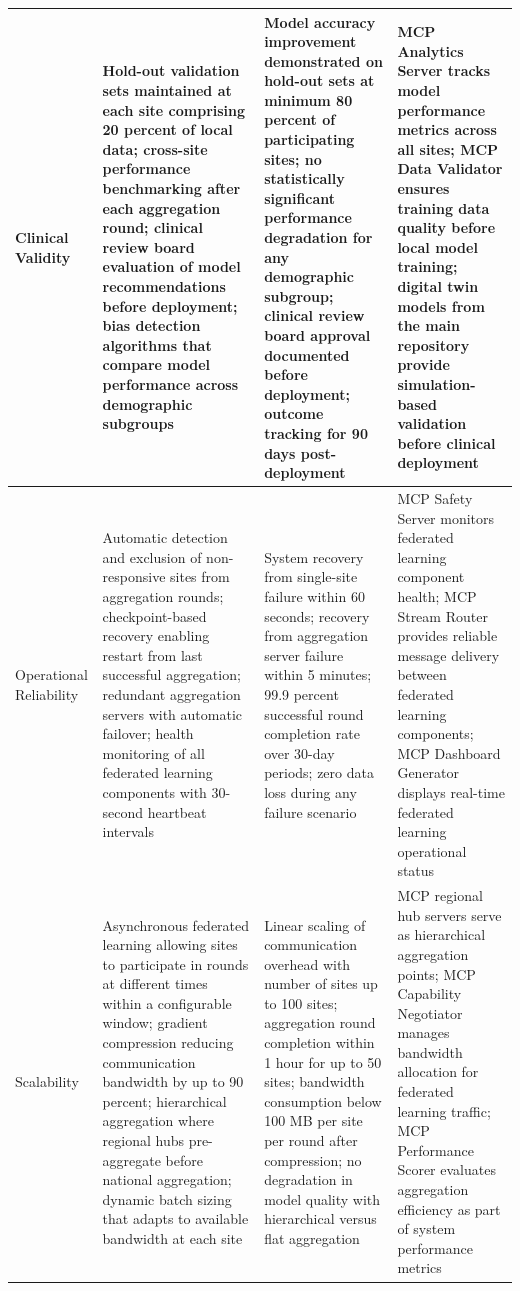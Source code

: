 \begin{longtable}{>{\raggedright\arraybackslash}p{2cm} >{\raggedright\arraybackslash}p{4.25cm} >{\raggedright\arraybackslash}p{4.25cm} >{\raggedright\arraybackslash}p{4.25cm}}
\midrule
Clinical Validity & Hold-out validation sets maintained at each site comprising 20 percent of local data; cross-site performance benchmarking after each aggregation round; clinical review board evaluation of model recommendations before deployment; bias detection algorithms that compare model performance across demographic subgroups & Model accuracy improvement demonstrated on hold-out sets at minimum 80 percent of participating sites; no statistically significant performance degradation for any demographic subgroup; clinical review board approval documented before deployment; outcome tracking for 90 days post-deployment & MCP Analytics Server tracks model performance metrics across all sites; MCP Data Validator ensures training data quality before local model training; digital twin models from the main repository \cite{main-repo} provide simulation-based validation before clinical deployment \\
\midrule
Operational Reliability & Automatic detection and exclusion of non-responsive sites from aggregation rounds; checkpoint-based recovery enabling restart from last successful aggregation; redundant aggregation servers with automatic failover; health monitoring of all federated learning components with 30-second heartbeat intervals & System recovery from single-site failure within 60 seconds; recovery from aggregation server failure within 5 minutes; 99.9 percent successful round completion rate over 30-day periods; zero data loss during any failure scenario & MCP Safety Server monitors federated learning component health; MCP Stream Router provides reliable message delivery between federated learning components; MCP Dashboard Generator displays real-time federated learning operational status \\
\midrule
Scalability & Asynchronous federated learning allowing sites to participate in rounds at different times within a configurable window; gradient compression reducing communication bandwidth by up to 90 percent; hierarchical aggregation where regional hubs pre-aggregate before national aggregation; dynamic batch sizing that adapts to available bandwidth at each site & Linear scaling of communication overhead with number of sites up to 100 sites; aggregation round completion within 1 hour for up to 50 sites; bandwidth consumption below 100 MB per site per round after compression; no degradation in model quality with hierarchical versus flat aggregation & MCP regional hub servers serve as hierarchical aggregation points; MCP Capability Negotiator manages bandwidth allocation for federated learning traffic; MCP Performance Scorer evaluates aggregation efficiency as part of system performance metrics \\
\end{longtable}


